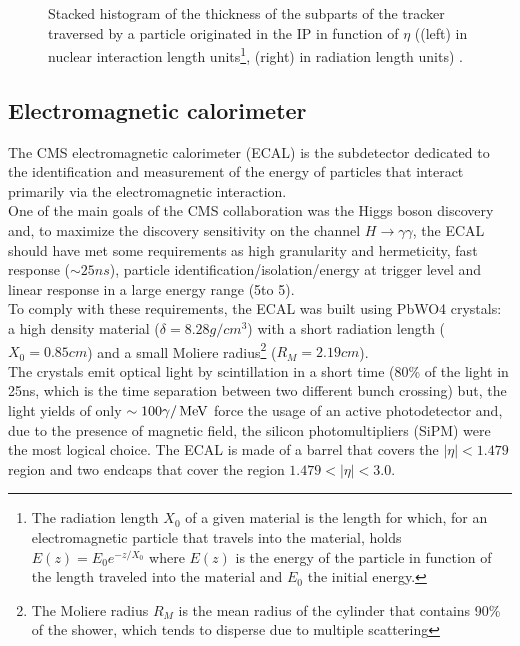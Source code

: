 \begin{figure}[h!]
\begin{minipage}{\linewidth}
\begin{minipage}{0.43\linewidth}
\end{minipage}
\caption[AAA]{Stacked histogram of the thickness of the subparts of the tracker traversed by a particle originated in the IP in function of $\eta$ ((left) in nuclear interaction length units\footnote{The radiation length $X_0$ of a given material is the length for which, for an electromagnetic particle that travels into the material, holds $E(z)=E_0 e^{-z/X_0}$ where $E(z)$ is the energy of the particle in function of the length traveled into the material and $E_0$ the initial energy.}, (right) in radiation length units)  \cite{TrackerMaterialBudgetplotsTWiki}.}
\end{minipage}

\end{figure}


\subsection{Electromagnetic calorimeter}
The CMS electromagnetic calorimeter (ECAL) \cite{HoferETHZurichHansHofer1997TheReport,Biino2015TheProjections} is the subdetector dedicated to the identification and measurement of the energy of particles that interact primarily via the electromagnetic interaction.\\
One of the main goals of the CMS collaboration was the Higgs boson discovery and, to maximize the discovery sensitivity on the channel $H \to \gamma \gamma$, the ECAL should have met some requirements as high granularity and hermeticity, fast response ($\sim 25ns$), particle identification/isolation/energy at trigger level and linear response in a large energy range (5\GeV to 5\TeV).\\
To comply with these requirements, the ECAL was built using PbWO4 crystals: a high density material ($\delta=8.28g/cm^3$) with a short radiation length ($X_0=0.85cm$) and a small Moliere radius\footnote{The Moliere radius $R_M$ is the mean radius of the cylinder that contains 90\% of the shower, which tends to disperse due to multiple scattering} ($R_M=2.19cm$).\\
The crystals emit optical light by scintillation in a short time (80\% of the light in 25ns, which is the time separation between two different bunch crossing) but, the light yields of only $\sim 100 \gamma/{\,\text{Me\hspace{-.08em}V}}$ force the usage of an active photodetector and, due to the presence of magnetic field, the silicon photomultipliers (SiPM) were the most logical choice.
The ECAL is made of a barrel that covers the $|\eta|<1.479$ region and two endcaps that cover the region $1.479<|\eta|<3.0$.
